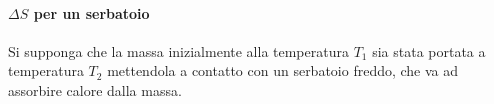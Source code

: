 \documentclass[10pt,a4paper]{book}
\begin{document}
\paragraph{$\Delta S$ per un serbatoio} Si supponga che la massa inizialmente alla temperatura $T_1$ sia stata portata a temperatura $T_2$ mettendola a contatto con un serbatoio freddo, che va ad assorbire calore dalla massa.
\begin{figure}[htpb]
	\centering
	


	\begin{tikzpicture}[x=0.75pt,y=0.75pt,yscale=-1,xscale=1]


\end{tikzpicture}
\end{figure}
\end{document}
